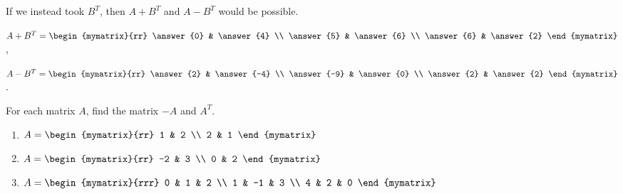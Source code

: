 \documentclass{ximera}
\begin{document}
\begin{problem}
\begin{enumerate}
\begin{sol}
      If we instead took $B^T$, then $A+B^T$ and $A-B^T$ would be possible.

      $A+B^T = \begin{mymatrix}{rr}
        \answer{0} & \answer{4}  \\
        \answer{5} & \answer{6}  \\
        \answer{6} & \answer{2} 
      \end{mymatrix}$,\quad

      $A-B^T = \begin{mymatrix}{rr}
        \answer{2} & \answer{-4}  \\
        \answer{-9} & \answer{0}  \\
        \answer{2} & \answer{2} 
      \end{mymatrix}$.



      \end{sol}

  \end{enumerate}
\end{problem}

\begin{problem}
  For each matrix $A$, find the matrix $-A$ and $A^T$.
  \begin{enumerate}
  \item
    $A = \begin{mymatrix}{rr}
      1 & 2 \\
      2 & 1
    \end{mymatrix}$

  \item
    $A = \begin{mymatrix}{rr}
      -2 & 3 \\
      0 & 2
    \end{mymatrix}$

  \item
    $A = \begin{mymatrix}{rrr}
      0 & 1 & 2 \\
      1 & -1 & 3 \\
      4 & 2 & 0
    \end{mymatrix}$
  \end{enumerate}
\end{problem}
\end{document}
